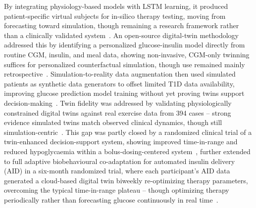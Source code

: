 \documentclass[journal]{IEEEtran}
\begin{document}
By integrating physiology-based models with LSTM learning, it produced patient-specific virtual subjects for in-silico therapy testing, moving from forecasting toward simulation, though remaining a research framework rather than a clinically validated system~\cite{ref13}. An open-source digital-twin methodology addressed this by identifying a personalized glucose-insulin model directly from routine CGM, insulin, and meal data, showing non-invasive, CGM-only twinning suffices for personalized counterfactual simulation, though use remained mainly retrospective~\cite{ref14}. Simulation-to-reality data augmentation then used simulated patients as synthetic data generators to offset limited T1D data availability, improving glucose prediction model training without yet proving twins support decision-making~\cite{ref15}. Twin fidelity was addressed by validating physiologically constrained digital twins against real exercise data from 394 cases -- strong evidence simulated twins match observed clinical dynamics, though still simulation-centric~\cite{ref16}. This gap was partly closed by a randomized clinical trial of a twin-enhanced decision-support system, showing improved time-in-range and reduced hypoglycaemia within a bolus-dosing-centered system~\cite{ref17}, further extended to full adaptive biobehavioural co-adaptation for automated insulin delivery (AID) in a six-month randomized trial, where each participant's AID data generated a cloud-based digital twin biweekly re-optimizing therapy parameters, overcoming the typical time-in-range plateau -- though optimizing therapy periodically rather than forecasting glucose continuously in real time~\cite{ref18}.
\end{document}

